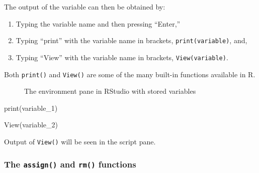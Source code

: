 \documentclass[
  letterpaper,
  DIV=11,
  numbers=noendperiod]{scrreprt}
\newenvironment{Shaded}{}{}
\newcommand{\FunctionTok}[1]{\textcolor[rgb]{0.44,0.26,0.76}{#1}}
\newcommand{\NormalTok}[1]{\textcolor[rgb]{0.14,0.16,0.18}{#1}}
\begin{document}
The output of the variable can then be obtained by:

\begin{enumerate}
\def\labelenumi{\arabic{enumi}.}
\item
  Typing the variable name and then pressing ``Enter,''
\item
  Typing ``print'' with the variable name in brackets,
  \texttt{print(variable)}, and,
\item
  Typing ``View'' with the variable name in brackets,
  \texttt{View(variable)}.
\end{enumerate}

Both \texttt{print()} and \texttt{View()} are some of the many built-in
functions available in R.

\begin{figure}


\caption{\label{fig-environment-1}The environment pane in RStudio with
stored variables}

\end{figure}%

\begin{Shaded}
\begin{Highlighting}[]
\FunctionTok{print}\NormalTok{(variable\_1)}
\end{Highlighting}
\end{Shaded}

\begin{Shaded}
\begin{Highlighting}[]
\FunctionTok{View}\NormalTok{(variable\_2)}
\end{Highlighting}
\end{Shaded}

Output of \texttt{View()} will be seen in the script pane.

\subsubsection{\texorpdfstring{The \texttt{assign()} and \texttt{rm()}
functions}{The assign() and rm() functions}}\label{the-assign-and-rm-functions}
\end{document}
